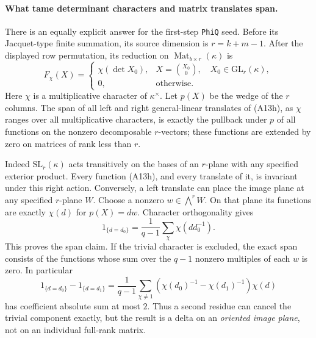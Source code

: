 \paragraph{What tame determinant characters and matrix translates span.}
There is an equally explicit answer for the first-step
\texttt{PhiQ} seed.  Before its Jacquet-type finite summation,
its source dimension is $r=k+m-1$.  After the displayed row
permutation, its reduction on
$\operatorname{Mat}_{b\times r}(\kappa)$ is
\[
 F_\chi(X)=
 \begin{cases}
   \chi(\det X_0),&X=\binom{X_0}{0},\quad X_0\in\mathrm{GL}_r(\kappa),\\
   0,&\text{otherwise}.
 \end{cases}
 \tag{A13h}
\]
Here $\chi$ is a multiplicative character of $\kappa^\times$.
Let $p(X)$ be the wedge of the $r$ columns.  The span of
all left and right general-linear translates of (A13h),
as $\chi$ ranges over all multiplicative characters, is
exactly the pullback under $p$ of all functions on the
nonzero decomposable $r$-vectors; these functions are extended
by zero on matrices of rank less than $r$.

Indeed $\mathrm{SL}_r(\kappa)$ acts transitively on the
bases of an $r$-plane with any specified exterior product.
Every function (A13h), and every translate of it, is invariant
under this right action.  Conversely, a left translate can
place the image plane at any specified $r$-plane $W$.
Choose a nonzero $w\in\bigwedge^rW$.  On that plane its
functions are exactly $\chi(d)$ for $p(X)=dw$.
Character orthogonality gives
\[
 1_{\{d=d_0\}}
       =\frac1{q-1}\sum_{\chi}\chi(dd_0^{-1}).
 \tag{A13i}
\]
This proves the span claim.  If the trivial character is
excluded, the exact span consists of the functions whose
sum over the $q-1$ nonzero multiples of each $w$ is zero.
In particular
\[
 1_{\{d=d_0\}}-1_{\{d=d_1\}}
   =\frac1{q-1}\sum_{\chi\ne1}
           (\chi(d_0)^{-1}-\chi(d_1)^{-1})\chi(d)
 \tag{A13j}
\]
has coefficient absolute sum at most $2$.
Thus a second residue can cancel the trivial component
exactly, but the result is a delta on an \emph{oriented
image plane}, not on an individual full-rank matrix.

